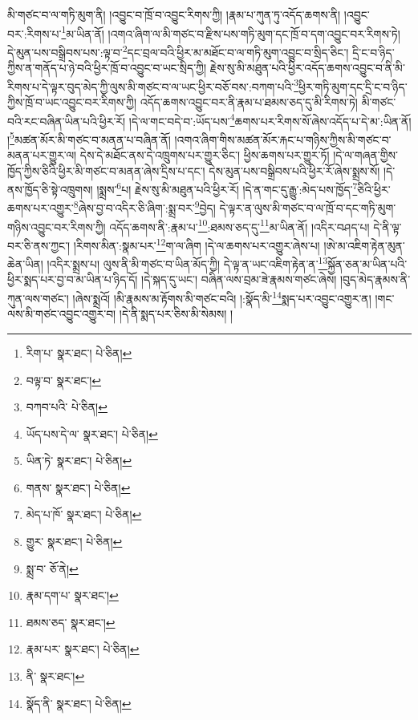 མི་གཙང་བ་ལ་གཏི་མུག་ནི། །འབྱུང་བ་ཁྲོ་བ་འབྱུང་རིགས་ཀྱི། །རྣམ་པ་ཀུན་ཏུ་འདོད་ཆགས་ནི། །འབྱུང་བར་:རིགས་པ་\footnote{རིག་པ་  སྣར་ཐང་།  པེ་ཅིན། }མ་ཡིན་ནོ། །འགའ་ཞིག་ལ་མི་གཙང་བ་རྫིས་པས་གཏི་མུག་དང་ཁྲོ་བ་དག་འབྱུང་བར་རིགས་ཏེ། དེ་མུན་པས་བསྒྲིབས་པས་:ལྟ་བ་\footnote{བལྟ་བ་  སྣར་ཐང་། }དང་བྲལ་བའི་ཕྱིར་མ་མཐོང་བ་ལ་གཏི་མུག་འབྱུང་བ་སྲིད་ཅིང་། དྲི་ང་བ་ཉིད་ཀྱིས་ན་གནོད་པ་ཉེ་བའི་ཕྱིར་ཁྲོ་བ་འབྱུང་བ་ཡང་སྲིད་ཀྱི། རྗེས་སུ་མི་མཐུན་པའི་ཕྱིར་འདོད་ཆགས་འབྱུང་བ་ནི་མི་རིགས་པ་དེ་ལྟར་བུད་མེད་ཀྱི་ལུས་མི་གཙང་བ་ལ་ཡང་ཕྱིར་བཅོ་བས་:བཀག་པའི་\footnote{བཀབ་པའི་  པེ་ཅིན། }ཕྱིར་གཏི་མུག་དང་དྲི་ང་བ་ཉིད་ཀྱིས་ཁྲོ་བ་ཡང་འབྱུང་བར་རིགས་ཀྱི། འདོད་ཆགས་འབྱུང་བར་ནི་རྣམ་པ་ཐམས་ཅད་དུ་མི་རིགས་ཏེ། མི་གཙང་བའི་རང་བཞིན་ཡིན་པའི་ཕྱིར་རོ། །དེ་ལ་གང་བདེ་བ་:ཡོད་པས་\footnote{ཡོད་པས་དེ་ལ་  སྣར་ཐང་།  པེ་ཅིན། }ཆགས་པར་རིགས་སོ་ཞེས་འདོད་པ་དེ་མ་:ཡིན་ནོ། །\footnote{ཡིན་ཏེ་  སྣར་ཐང་།  པེ་ཅིན། }མཚན་མོར་མི་གཙང་བ་མནན་པ་བཞིན་ནོ། །འགའ་ཞིག་གིས་མཚན་མོར་རྐང་པ་གཉིས་ཀྱིས་མི་གཙང་བ་མནན་པར་གྱུར་ལ། དེས་དེ་མཐོང་ནས་དེ་འཁྲུགས་པར་གྱུར་ཅིང་། ཕྱིས་ཆགས་པར་གྱུར་ཏོ། །དེ་ལ་གཞན་གྱིས་ཁྱོད་ཀྱིས་ཅིའི་ཕྱིར་མི་གཙང་བ་མནན་ཞེས་དྲིས་པ་དང་། དེས་མུན་པས་བསྒྲིབས་པའི་ཕྱིར་རོ་ཞེས་སྨྲས་སོ། །དེ་ནས་ཁྱོད་ཅི་སྟེ་འཁྲུགས། །སྨྲས་\footnote{གནས་  སྣར་ཐང་།  པེ་ཅིན། }པ། རྗེས་སུ་མི་མཐུན་པའི་ཕྱིར་རོ། །དེ་ན་གང་དུ་རྒྱུ་:མེད་པས་ཁྱོད་\footnote{མེད་པ་ཁོ་  སྣར་ཐང་།  པེ་ཅིན། }ཅིའི་ཕྱིར་ཆགས་པར་འགྱུར་\footnote{གྱུར་  སྣར་ཐང་།  པེ་ཅིན། }ཞེས་བྱ་བ་འདིར་ཅི་ཞིག་:སྨྲ་བར་\footnote{སྨྲ་བ་  ཅོ་ནེ། }བྱེད། དེ་ལྟར་ན་ལུས་མི་གཙང་བ་ལ་ཁྲོ་བ་དང་གཏི་མུག་གཉིས་འབྱུང་བར་རིགས་ཀྱི། འདོད་ཆགས་ནི་:རྣམ་པ་\footnote{རྣམ་དག་པ་  སྣར་ཐང་། }:ཐམས་ཅད་དུ་\footnote{ཐམས་ཅད་  སྣར་ཐང་། }མ་ཡིན་ནོ། །འདིར་བཤད་པ། དེ་ནི་ལྟ་བར་ཅི་ནས་ཀྱང་། །རིགས་མིན་:སྣམ་པར་\footnote{རྣམ་པར་  སྣར་ཐང་།  པེ་ཅིན། }ག་ལ་ཞིག །དེ་ལ་ཆགས་པར་འགྱུར་ཞེས་པ། །ཨེ་མ་འཇིག་རྟེན་མུན་ཆེན་ཡིན། །འདིར་སྨྲས་པ། ལུས་ནི་མི་གཙང་བ་ཡིན་མོད་ཀྱི། དེ་ལྟ་ན་ཡང་འཇིག་རྟེན་ན་\footnote{ནི་  སྣར་ཐང་། }སྐྱོན་ཅན་མ་ཡིན་པའི་ཕྱིར་སྨད་པར་བྱ་བ་མ་ཡིན་པ་ཉིད་དོ། །དེ་སྐད་དུ་ཡང་། བཞིན་ལས་བྲམ་ཟེ་རྣམས་གཙང་ཞེས། །བུད་མེད་རྣམས་ནི་ཀུན་ལས་གཙང་། །ཞེས་སྨྲའོ། །མི་རྣམས་མ་རྟོགས་མི་གཙང་བའི། །:སྣོད་མི་\footnote{སྣོད་ནི་  སྣར་ཐང་།  པེ་ཅིན། }སྨད་པར་འབྱུང་འགྱུར་ན། །གང་ལས་མི་གཙང་འབྱུང་འགྱུར་བ། །དེ་ནི་སྨད་པར་ཅིས་མི་སེམས། །
